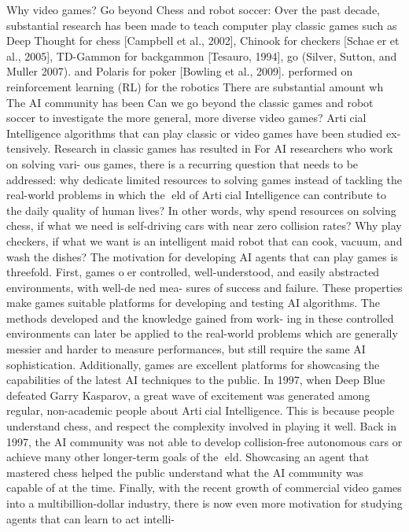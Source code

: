 Why video games?
Go beyond Chess and robot soccer:
Over the past decade, substantial research has been made to teach computer play classic games such
as Deep Thought for chess [Campbell et al., 2002],
Chinook for checkers [Schaeer et al., 2005], TD-Gammon for backgammon [Tesauro, 1994],
go (Silver, Sutton, and Muller 2007).
and Polaris for poker [Bowling et al., 2009].
performed on reinforcement learning (RL) for the robotics
There are substantial amount wh
The AI community has been 
Can we go beyond the classic games and robot soccer to investigate the more general, more diverse
video games? 
Articial Intelligence algorithms that can play classic or video games have been studied ex-
tensively. Research in classic games has resulted in  For AI researchers who work on solving vari-
ous games, there is a recurring question that needs to be addressed: why dedicate limited
resources to solving games instead of tackling the real-world problems in which the eld of
Articial Intelligence can contribute to the daily quality of human lives? In other words,
why spend resources on solving chess, if what we need is self-driving cars with near zero
collision rates? Why play checkers, if what we want is an intelligent maid robot that can
cook, vacuum, and wash the dishes?
The motivation for developing AI agents that can play games is threefold. First, games
oer controlled, well-understood, and easily abstracted environments, with well-dened mea-
sures of success and failure. These properties make games suitable platforms for developing
and testing AI algorithms. The methods developed and the knowledge gained from work-
ing in these controlled environments can later be applied to the real-world problems which
are generally messier and harder to measure performances, but still require the same AI
sophistication.
Additionally, games are excellent platforms for showcasing the capabilities of the latest
AI techniques to the public. In 1997, when Deep Blue defeated Garry Kasparov, a great
wave of excitement was generated among regular, non-academic people about Articial
Intelligence. This is because people understand chess, and respect the complexity involved
in playing it well. Back in 1997, the AI community was not able to develop collision-free
autonomous cars or achieve many other longer-term goals of the eld. Showcasing an agent
that mastered chess helped the public understand what the AI community was capable of
at the time.
Finally, with the recent growth of commercial video games into a multibillion-dollar
industry, there is now even more motivation for studying agents that can learn to act intelli-
